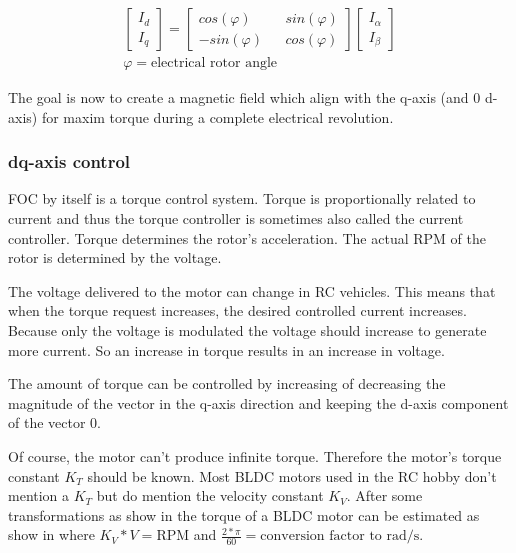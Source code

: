\documentclass[]{report}
\begin{document}
\begin{equation} \label{eq:ParkTransformMatrix}
\begin{split}
	\begin{bmatrix} I_d \\ I_q \end{bmatrix}
	= 
	\begin{bmatrix}
		cos(\varphi) && sin(\varphi) \\
		-sin(\varphi) && cos(\varphi)
	\end{bmatrix}
	\begin{bmatrix} I_\alpha \\ I_\beta \end{bmatrix} \\
	\varphi = \text{electrical rotor angle}
\end{split}	
\end{equation}

The goal is now to create a magnetic field which align with the q-axis (and 0 d-axis) for maxim torque during a complete electrical revolution.

\subsubsection{dq-axis control}
FOC by itself is a torque control system. Torque is proportionally related to current and thus the torque controller is sometimes also called the current controller. Torque determines the rotor's acceleration. The actual RPM of the rotor is determined by the voltage.

The voltage delivered to the motor can change in RC vehicles. This means that when the torque request increases, the desired controlled current increases. Because only the voltage is modulated the voltage should increase to generate more current. So an increase in torque results in an increase in voltage.

The amount of torque can be controlled by increasing of decreasing the magnitude of the vector in the q-axis direction and keeping the d-axis component of the vector 0.


Of course, the motor can't produce infinite torque. Therefore the motor's torque constant $K_T$ should be known. Most BLDC motors used in the RC hobby don't mention a $K_T$ but do mention the velocity constant $K_V$. After some transformations as show in \cite{BLDC_Torque_estimation} the torque of a BLDC motor can be estimated as show in \cite{RCBLDC_Motor_Constants} where $K_V*V = \text{RPM}$ and $\frac{2*\pi}{60} = \text{conversion factor to rad/s}$.
\end{document}
